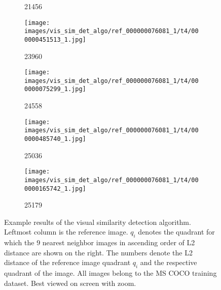 \begin{figure}[h!]
\begin{subfigure}[b]{0.09\textwidth}
         \caption*{21456}         
         \label{fig:vis_sim_img_ex_4_6}
     \end{subfigure}  
     \hfill
     \begin{subfigure}[b]{0.09\textwidth}
         \centering
         \texttt{[image: images/vis\_sim\_det\_algo/ref\_000000076081\_1/t4/000000451513\_1.jpg]}
         \caption*{23960}     
         \label{fig:vis_sim_img_ex_4_7}
     \end{subfigure}  
     \begin{subfigure}[b]{0.09\textwidth}
         \centering
         \texttt{[image: images/vis\_sim\_det\_algo/ref\_000000076081\_1/t4/000000075299\_1.jpg]}
         \caption*{24558}         
         \label{fig:vis_sim_img_ex_4_8}
     \end{subfigure}  
     \hfill
     \begin{subfigure}[b]{0.09\textwidth}
         \centering
         \texttt{[image: images/vis\_sim\_det\_algo/ref\_000000076081\_1/t4/000000485740\_1.jpg]}
         \caption*{25036}                  
         \label{fig:vis_sim_img_ex_4_9}
     \end{subfigure}  
     \hfill
     \begin{subfigure}[b]{0.09\textwidth}
         \centering
         \texttt{[image: images/vis\_sim\_det\_algo/ref\_000000076081\_1/t4/000000165742\_1.jpg]}
         \caption*{25179}
         \label{fig:vis_sim_img_ex_4_10}
     \end{subfigure}  
    \caption{Example results of the visual similarity detection algorithm. Leftmost column is the reference image. $q_i$ denotes the quadrant for which the 9 nearest neighbor images in ascending order of L2 distance are shown on the right. The numbers denote the L2 distance of the reference image quadrant $q_i$ and the respective quadrant of the image. All images belong to the MS COCO training dataset. Best viewed on screen with zoom.}
    \label{fig:results_vis_sim_det_algorithm}
\end{figure}